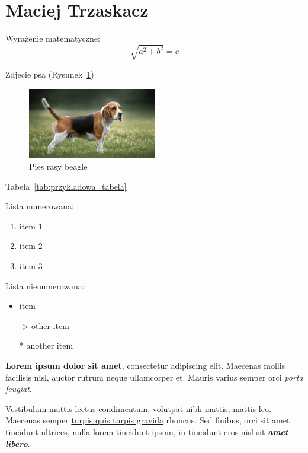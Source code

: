 \section{Maciej Trzaskacz}

Wyrażenie matematyczne: \[\sqrt{a^2+b^2}=c\]


Zdjecie psa (Rysunek~\ref{fig:pies})
\begin{figure}[htbp]
    \centering
    \includegraphics[width=0.5\textwidth]{pictures/pies.jpg}
    \caption{Pies rasy beagle}
    \label{fig:pies}
\end{figure}
    
Tabela~\ref{tab:przykladowa_tabela}


    Lista numerowana:
    \begin{enumerate}
        \item item 1
        \item item 2
        \item item 3
    \end{enumerate}
    
    Lista nienumerowana:
    \begin{itemize}
        \item item
        \item[->] other item
        \item[*] another item
    \end{itemize}

    \textbf{Lorem ipsum dolor sit amet}, consectetur adipiscing elit. Maecenas mollis facilisis nisl, auctor rutrum neque ullamcorper et. Mauris varius semper orci \textit{porta feugiat}.
    
    Vestibulum mattis lectus condimentum, volutpat nibh mattis, mattis leo. Maecenas semper \underline{turpis quis turpis gravida} rhoncus. Sed finibus, orci sit amet tincidunt ultrices, nulla lorem tincidunt ipsum, in tincidunt eros nisl sit \textbf{\textit{\underline{amet libero}}}.